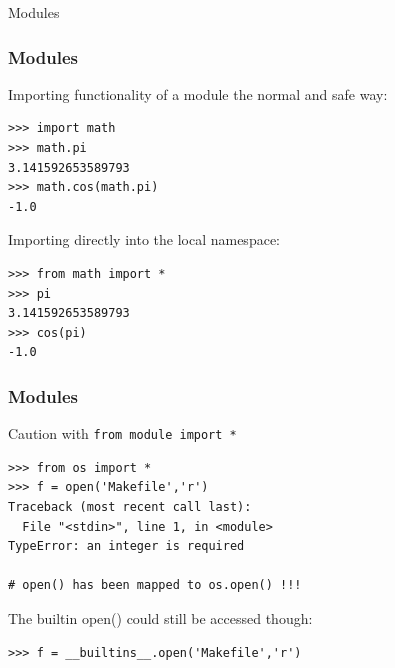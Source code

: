 \begin{frame}
    \begin{center}
    \Huge{Modules}
    \end{center}
\end{frame}

\begin{frame}[fragile]
    \frametitle{Modules}
Importing functionality of a module the normal and safe way:
    \begin{myColorBox}{0.9}{}
\begin{verbatim}
>>> import math
>>> math.pi
3.141592653589793
>>> math.cos(math.pi)
-1.0
\end{verbatim}
    \end{myColorBox}
\pause
Importing directly into the local namespace:
    \begin{myColorBox}{0.9}{}
\begin{verbatim}
>>> from math import *
>>> pi
3.141592653589793
>>> cos(pi)
-1.0
\end{verbatim}
    \end{myColorBox}
\end{frame}

\begin{frame}[fragile]
\frametitle{Modules}
Caution with \verb#from module import *#
    \begin{myColorBox}{0.9}{}
\begin{verbatim}
>>> from os import *
>>> f = open('Makefile','r')
Traceback (most recent call last):
  File "<stdin>", line 1, in <module>
TypeError: an integer is required

# open() has been mapped to os.open() !!!
\end{verbatim}
\end{myColorBox}
The builtin open() could still be accessed though:
\begin{myColorBox}{0.9}{}
\begin{verbatim}
>>> f = __builtins__.open('Makefile','r')
\end{verbatim}
\end{myColorBox}
\end{frame}

